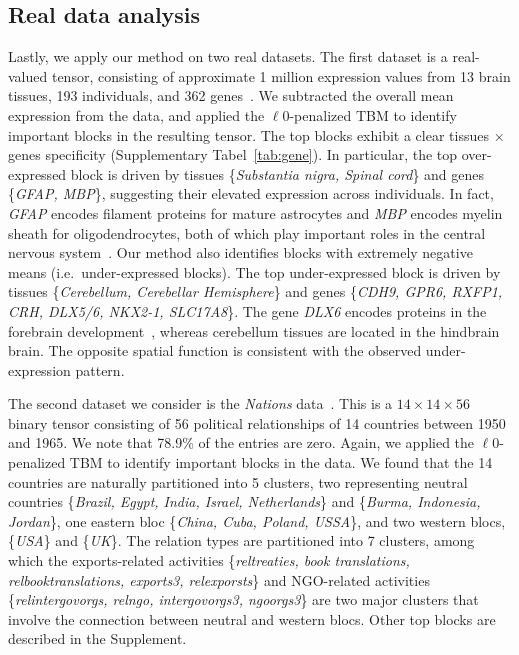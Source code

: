 \documentclass{article}
\begin{document}
\vspace{-.3cm}
\subsection{Real data analysis}
\vspace{-.05cm}
Lastly, we apply our method on two real datasets. %
The first dataset is a real-valued tensor, consisting of approximate 1 million expression values from 13 brain tissues, 193 individuals, and 362 genes~\cite{wang2017three}. We subtracted the overall mean expression from the data, and applied the $\ell0$-penalized TBM to identify important blocks in the resulting tensor. The top blocks exhibit a clear tissues $\times$ genes specificity (Supplementary Tabel~\ref{tab:gene}). In particular, the top over-expressed block is driven by tissues \{\emph{Substantia nigra, Spinal cord}\} and genes \{\emph{GFAP, MBP}\}, suggesting their elevated expression across individuals. In fact, \emph{GFAP} encodes filament proteins for mature astrocytes and \emph{MBP} encodes myelin sheath for oligodendrocytes, both of which play important roles in the central nervous system~\cite{o2015reference}. Our method also identifies blocks with extremely negative means (i.e.\ under-expressed blocks). The top under-expressed block is driven by tissues \{\emph{Cerebellum, Cerebellar Hemisphere}\} and genes \{\emph{CDH9, GPR6, RXFP1, CRH, DLX5/6, NKX2-1, SLC17A8}\}. The gene \emph{DLX6} encodes proteins in the forebrain development~\cite{o2015reference}, whereas cerebellum tissues are located in the hindbrain brain. The opposite spatial function is consistent with the observed under-expression pattern. 


The second dataset we consider is the \emph{Nations} data~\cite{nickel2011three}. This is a $14\times 14 \times 56$ binary tensor consisting of 56 political relationships of 14 countries between 1950 and 1965. We note that 78.9\% of the entries are zero. Again, we applied the $\ell0$-penalized TBM to identify important blocks in the data. 
We found that the 14 countries are naturally partitioned into 5 clusters, two representing neutral countries \{\emph{Brazil, Egypt, India, Israel, Netherlands}\} and \{\emph{Burma, Indonesia, Jordan}\}, one eastern bloc \{\emph{China, Cuba, Poland, USSA}\}, and two western blocs, \{\emph{USA}\} and \{\emph{UK}\}. The relation types are partitioned into 7 clusters, among which the exports-related activities \{\emph{reltreaties, book translations, relbooktranslations, exports3, relexporsts}\} and NGO-related activities \{\emph{relintergovorgs, relngo, intergovorgs3, ngoorgs3}\} are two major clusters that involve the connection between neutral and western blocs. Other top blocks are described in the Supplement. 
\end{document}
